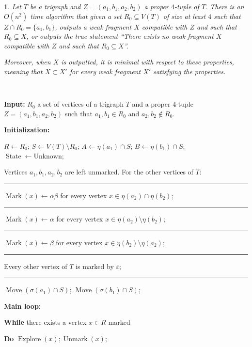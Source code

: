 \documentclass[11 pt] {article}
\DeclareMathOperator{\Mark}{Mark}
\DeclareMathOperator{\Move}{Move}
\DeclareMathOperator{\Unmark}{Unmark}
\DeclareMathOperator{\Explore}{Explore}
\DeclareMathOperator{\State}{State}
\newtheorem{theorem}{}[section]
\newcounter{claim}
\newcommand{\Proof}{\setcounter{claim}{0}\noindent{\bf Proof.}\ \ }
\begin{document}
\begin{theorem}\label{l:forcing}
  Let $T$ be a trigraph and $Z = (a_1, b_1, a_2, b_2)$ a proper
  $4$-tuple of $T$.  There is an $O(n^2)$ time algorithm that given a
  set $R_0 \subseteq V(T)$ of size at least $4$ such that $Z \cap R_0
  = \{a_1, b_1\}$, outputs a weak fragment $X$ compatible with $Z$ and
  such that $R_0 \subseteq X$, or outputs the true statement ``There
  exists no weak fragment $X$ compatible with $Z$ and such that $R_0
  \subseteq X$''.

  Moreover, when $X$ is outputted, it is minimal with respect to
  these properties, meaning that $X \subset X'$ for every weak
  fragment $X'$ satisfying the properties.
\end{theorem}

\Proof
\begin{table}{\small\label{algoM}
\begin{description}
\item{\bf Input:} $R_0$ a  set of vertices of a trigraph $T$ and a proper $4$-tuple $Z = (a_1, b_1, a_2, b_2)$ such
  that $a_{1}, b_{1} \in R_0$ and $a_{2}, b_{2} \notin R_0$.

\item{\bf Initialization:}

$R \leftarrow R_0$; $S \leftarrow V(T) \setminus R_0$; 
$A \leftarrow \eta(a_{1})\cap S$;  $B \leftarrow \eta(b_{1})\cap S$;\\
$\State \leftarrow \text{Unknown}$;


Vertices $a_{1}, b_{1}, a_{2}, b_{2}$ are left unmarked. For the other vertices of $T$:

\rule{1em}{0ex}$\Mark(x) \leftarrow \alpha\beta$ for every vertex $x \in  \eta(a_{2})\cap \eta(b_{2}) $;

\rule{1em}{0ex}$\Mark(x) \leftarrow \alpha$ for every vertex $x \in  \eta(a_{2}) \setminus \eta(b_{2}) $;

\rule{1em}{0ex}$\Mark(x) \leftarrow \beta$ for every vertex $x \in  \eta(b_{2}) \setminus \eta(a_{2}) $;

\rule{1em}{0ex}Every other vertex of $T$ is marked by $\varepsilon$;

\rule{1em}{0ex}$\Move(\sigma(a_1) \cap S)$; $\Move(\sigma(b_1) \cap S)$;



\item{\bf Main loop:}


\textbf{While} there exists a vertex $x \in R$ marked

\textbf{Do} $\Explore(x); \Unmark(x);$


\end{description}}
\end{table}
\end{document}
